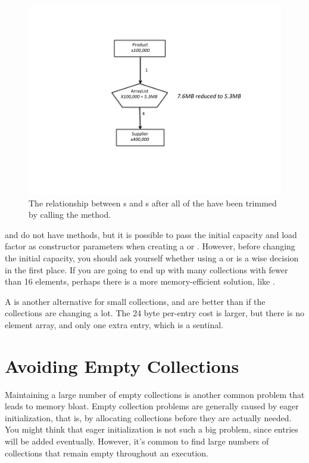  \begin{figure}
  \centering
 \includegraphics[width=.80\textwidth]{part1/Figures/collections/trimmed-product.pdf}
 \caption{The relationship between s and s after
 all of the
  have been trimmed by calling the  method.}
  \label{fig:trimmed-product}
\end{figure}
 
 and  do not have  methods,
but it is possible to pass the initial capacity and load factor as constructor
parameters when creating a  or . 
However, before changing the initial capacity, you should
ask yourself whether using a  or  is a
wise decision in the first place. If you are going to end up with many
collections with fewer than 16 elements, perhaps there is a more memory-efficient solution, like
.
  
A  is another alternative for small collections, and are
better than  if the collections are changing a lot. The
24 byte per-entry cost is larger, but there is no element array, and only one
extra entry, which is a sentinal.

\section{Avoiding Empty Collections}

Maintaining a large number of empty collections is another common problem that
leads to memory bloat. Empty collection problems are generally caused by eager
initialization, that is, by allocating collections before they are actually
needed. You might think that eager initialization is not such a big problem, since entries will be added
eventually. However, it's common to
find large numbers of collections that remain empty throughout an execution.

